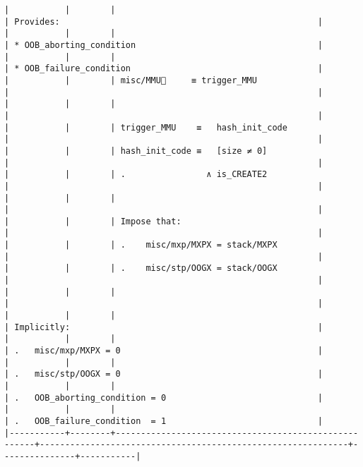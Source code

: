 \documentclass[varwidth=\maxdimen,margin=0.5cm,multi={verbatim}]{standalone}
\begin{document}
\begin{verbatim}
|           |        |                                                      | Provides:                                                   |
|           |        |                                                      | * OOB_aborting_condition                                    |
|           |        |                                                      | * OOB_failure_condition                                     |
|           |        | misc/MMU🚩     ≡ trigger_MMU                         |                                                             |
|           |        |                                                      |                                                             |
|           |        | trigger_MMU    ≡   hash_init_code                    |                                                             |
|           |        | hash_init_code ≡   [size ≠ 0]                        |                                                             |
|           |        | .                ∧ is_CREATE2                        |                                                             |
|           |        |                                                      |                                                             |
|           |        | Impose that:                                         |                                                             |
|           |        | .    misc/mxp/MXPX = stack/MXPX                      |                                                             |
|           |        | .    misc/stp/OOGX = stack/OOGX                      |                                                             |
|           |        |                                                      |                                                             |
|           |        |                                                      | Implicitly:                                                 |
|           |        |                                                      | .   misc/mxp/MXPX = 0                                       |
|           |        |                                                      | .   misc/stp/OOGX = 0                                       |
|           |        |                                                      | .   OOB_aborting_condition = 0                              |
|           |        |                                                      | .   OOB_failure_condition  = 1                              |
|-----------+--------+------------------------------------------------------+-------------------------------------------------------------+---------------+-----------|

\end{verbatim}
\end{document}
